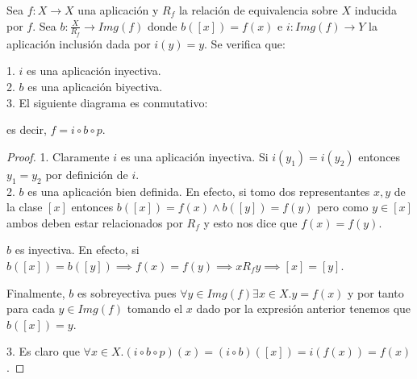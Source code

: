 \begin{theorem}
	Sea $f:X \to X$ una aplicación y $R_f$ la relación de equivalencia sobre $X$ inducida por $f$. Sea $b:\frac{X}{R_f} \to Img(f)$ donde $b([x]) = f(x)$ e $i:Img(f) \to Y$ la aplicación inclusión dada por $i(y) = y$. Se verifica que:
	
	1. $i$ es una aplicación inyectiva.\\
	2. $b$ es una aplicación biyectiva.\\
	3. El siguiente diagrama es conmutativo:
	

	es decir, $f = i \circ b \circ p$. 
\end{theorem}
\begin{proof}
	1. Claramente $i$ es una aplicación inyectiva. Si $i(y_1) = i(y_2)$ entonces $y_1 = y_2$ por definición de $i$. \\
	2. $b$ es una aplicación bien definida. En efecto, si tomo dos representantes $x,y$ de la clase $[x]$ entonces $b([x]) = f(x) \land b([y]) = f(y)$ pero como $y \in [x]$ ambos deben estar relacionados por $R_f$ y esto nos dice que $f(x) = f(y)$. 
	
	$b$ es inyectiva. En efecto, si $b([x]) = b([y]) \implies f(x) = f(y) \implies xR_fy \implies [x] = [y]$. 
	
	Finalmente, $b$ es sobreyectiva pues $\forall y \in Img(f) \exists x \in X.y = f(x)$ y por tanto para cada $y \in Img(f)$ tomando el $x$ dado por la expresión anterior tenemos que $b([x]) = y$. 
	
	3. Es claro que $\forall x \in X. (i \circ b \circ p)(x) = (i \circ b)([x]) = i(f(x)) = f(x)$. 
\end{proof}


